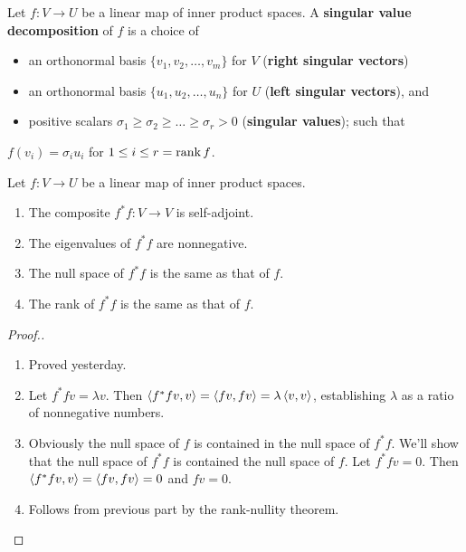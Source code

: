 \begin{definition}
  Let \(f : V \to U\) be a linear map of inner product spaces.
  A \textbf{singular value decomposition} of \(f\) is a choice of
  \begin{itemize}
    \item
    an orthonormal basis
    \(\{v_1, v_2,\ldots, v_m\}\) for \(V\)  (\textbf{right singular vectors})
    \item
    an orthonormal basis
    \(\{u_1, u_2,\ldots, u_n\}\) for \(U\) (\textbf{left singular vectors}), and
    \item
    positive scalars
    \(\sigma_1 \geq \sigma_2 \geq \ldots \geq \sigma_r > 0\) (\textbf{singular values}); such that
  \end{itemize}
  \(f(v_i) = \sigma_i u_i\) for \(1 \leq i \leq r = \rank f\).
\end{definition}

\begin{lemma}
  Let \(f : V\to U\) be a linear map of inner product spaces.
  \begin{enumerate}
    \item The composite \(f^* f: V \to V\) is self-adjoint.
    \item The eigenvalues of \(f^* f\) are nonnegative.
    \item The null space of \(f^* f\) is the same as that of \(f\).
    \item The rank of \(f^* f\) is the same as that of \(f\).
  \end{enumerate}
\end{lemma}
\begin{proof}[Proof.]
  \begin{enumerate}
    \item
    Proved yesterday.
    \item
    Let \(f^* f v = \lambda v\).
    Then \(\left\langle f^* f v, v\right\rangle = \left\langle fv, fv\right\rangle = \lambda \left\langle v, v\right\rangle\),
    establishing \(\lambda\) as a ratio of nonnegative numbers.
    \item
    Obviously the null space of \(f\) is contained in the null space of \(f^*f\).
    We'll show that the null space of \(f^*f\) is contained the null space of \(f\).
    Let \(f^*fv = 0\). Then \(\left\langle f^*fv, v\right\rangle = \left\langle fv, fv\right\rangle = 0\)
    and \(fv = 0\).
    \item
    Follows from previous part by the rank-nullity theorem.
  \end{enumerate}
\end{proof}

